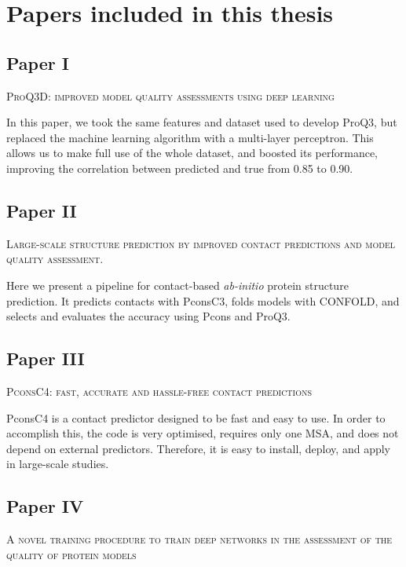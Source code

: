 \chapter{Papers included in this thesis}

\section*{Paper I}
\begin{center}
	\textsc{ProQ3D: improved model quality assessments using deep learning}
\end{center}
\noindent
In this paper, we took the same features and dataset used to develop ProQ3, but replaced the machine learning algorithm with a multi-layer perceptron.
This allows us to make full use of the whole dataset, and boosted its performance, improving the correlation between predicted and true from 0.85 to 0.90.

\section*{Paper II}
\begin{center}
	\textsc{Large-scale structure prediction by improved contact predictions and model quality assessment.}
\end{center}

\noindent
Here we present a pipeline for contact-based \emph{ab-initio} protein structure prediction.
It predicts contacts with PconsC3, folds models with CONFOLD, and selects and evaluates the accuracy using Pcons and ProQ3.
\newpage
\section*{Paper III}
\begin{center}
	\textsc{PconsC4: fast, accurate and hassle-free contact predictions}
\end{center}

\noindent
PconsC4 is a contact predictor designed to be fast and easy to use.
In order to accomplish this, the code is very optimised, requires only one MSA, and does not depend on external predictors.
Therefore, it is easy to install, deploy, and apply in large-scale studies.


\section*{Paper IV}
\begin{center}
	\textsc{A novel training procedure to train deep networks in the assessment of the quality of protein models}
\end{center}

